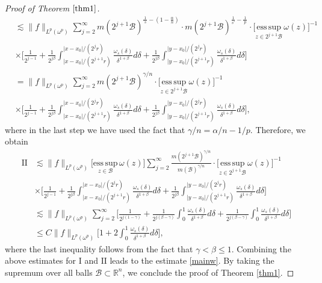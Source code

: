 \documentclass[preprint,10pt]{elsarticle}
\numberwithin{equation}{section}
\begin{document}
\begin{proof}[Proof of Theorem $\ref{thm1}$]
\begin{equation*}
\begin{split}
&\lesssim\|f\|_{L^p(\omega^p)}\sum_{j=2}^\infty m(2^{j+1}\mathcal{B})^{\frac{\,1\,}{s}-(1-\frac{\alpha}{n})}\cdot m(2^{j+1}\mathcal{B})^{\frac{1}{s'}-\frac{\,1\,}{p}}
\cdot\Big[\underset{z\in 2^{j+1}\mathcal{B}}{\mathrm{ess\,sup}}\,\omega(z)\Big]^{-1}\\
&\times\bigg[\frac{1}{2^{j-1}}+\frac{1}{2^{j\beta}}
\int_{|x-x_0|/{(2^{j+1}r)}}^{|x-x_0|/{(2^jr)}}\frac{\omega_s(\delta)}{\delta^{1+\beta}}d\delta
+\frac{1}{2^{j\beta}}
\int_{|y-x_0|/{(2^{j+1}r)}}^{|y-x_0|/{(2^jr)}}\frac{\omega_s(\delta)}{\delta^{1+\beta}}d\delta\bigg]\\
&=\|f\|_{L^p(\omega^p)}\sum_{j=2}^\infty m(2^{j+1}\mathcal{B})^{{\gamma}/{n}}
\cdot\Big[\underset{z\in 2^{j+1}\mathcal{B}}{\mathrm{ess\,sup}}\,\omega(z)\Big]^{-1}\\
&\times\bigg[\frac{1}{2^{j-1}}+\frac{1}{2^{j\beta}}
\int_{|x-x_0|/{(2^{j+1}r)}}^{|x-x_0|/{(2^jr)}}\frac{\omega_s(\delta)}{\delta^{1+\beta}}d\delta
+\frac{1}{2^{j\beta}}
\int_{|y-x_0|/{(2^{j+1}r)}}^{|y-x_0|/{(2^jr)}}\frac{\omega_s(\delta)}{\delta^{1+\beta}}d\delta\bigg],
\end{split}
\end{equation*}
where in the last step we have used the fact that $\gamma/n=\alpha/n-1/p$. Therefore, we obtain
\begin{equation*}
\begin{split}
\mathrm{II}&\lesssim\|f\|_{L^p(\omega^p)}\Big[\underset{z\in \mathcal{B}}{\mathrm{ess\,sup}}\,\omega(z)\Big]
\sum_{j=2}^\infty\frac{m(2^{j+1}\mathcal{B})^{{\gamma}/{n}}}{m(\mathcal{B})^{\gamma/n}}
\cdot\Big[\underset{z\in 2^{j+1}\mathcal{B}}{\mathrm{ess\,sup}}\,\omega(z)\Big]^{-1}\\
&\times\bigg[\frac{1}{2^{j-1}}+\frac{1}{2^{j\beta}}
\int_{|x-x_0|/{(2^{j+1}r)}}^{|x-x_0|/{(2^jr)}}\frac{\omega_s(\delta)}{\delta^{1+\beta}}d\delta
+\frac{1}{2^{j\beta}}
\int_{|y-x_0|/{(2^{j+1}r)}}^{|y-x_0|/{(2^jr)}}\frac{\omega_s(\delta)}{\delta^{1+\beta}}d\delta\bigg]\\
&\lesssim\|f\|_{L^p(\omega^p)}\sum_{j=2}^\infty\bigg[\frac{1}{2^{j(1-\gamma)}}+\frac{1}{2^{j(\beta-\gamma)}}
\int_{0}^{1}\frac{\omega_s(\delta)}{\delta^{1+\beta}}d\delta
+\frac{1}{2^{j(\beta-\gamma)}}
\int_{0}^{1}\frac{\omega_s(\delta)}{\delta^{1+\beta}}d\delta\bigg]\\
&\leq C\|f\|_{L^p(\omega^p)}\bigg[1+2\int_0^1\frac{\omega_s(\delta)}{\delta^{1+\beta}}d\delta\bigg],
\end{split}
\end{equation*}
where the last inequality follows from the fact that $\gamma<\beta\leq1$. Combining the above estimates for $\mathrm{I}$ and $\mathrm{II}$ leads to the estimate \eqref{mainw}. By taking the supremum over all balls $\mathcal{B}\subset\mathbb R^n$, we conclude the proof of Theorem \ref{thm1}.
\end{proof}
\end{document}

